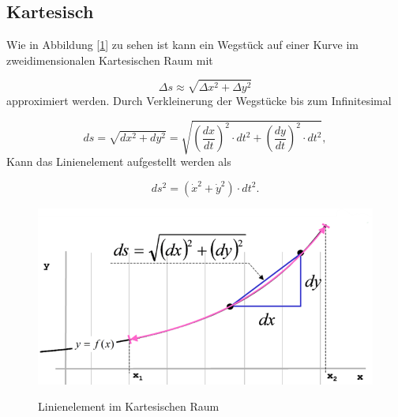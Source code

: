 %
%
%
%
\usepackage{graphicx}
\subsection{Kartesisch\label{geodaeten:section:LinKartesisch}}

Wie in Abbildung [\ref{geodaeten:Linienelemente:figure1}] zu sehen ist kann ein Wegstück auf einer Kurve im zweidimensionalen Kartesischen Raum mit

\begin{equation}
	\Delta s \approx \sqrt{\Delta x^2 + \Delta y^2}
\end{equation}
approximiert werden.
Durch Verkleinerung der Wegstücke bis zum Infinitesimal 

\begin{equation}
	d s = \sqrt{d x^2 + d y^2}
	= \sqrt{\left(\frac{d x}{d t}\right)^2 \cdot d t^2 + \left(\frac{d y}{d t}\right)^2 \cdot d t^2} ,
\end{equation}
Kann das Linienelement aufgestellt werden als

\begin{equation}
 	ds^2 = \left(\dot{x}^2 +\dot{y}^2\right) \cdot dt^2 .
 	\label{geodaeten:equation:Linienelemente:Kartesisch:equation1}
\end{equation}



\begin{figure}
	\centering
	\includegraphics[width=0.7\linewidth]{papers/geodaeten/Abbildungen/Linienelemente/LinKartes1}
	\caption{Linienelement im Kartesischen Raum}
	\label{geodaeten:Linienelemente:figure1}
	\cite{geodaeten:kartesisch}
\end{figure}

